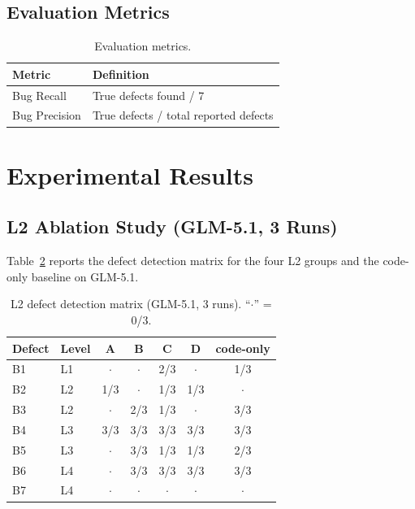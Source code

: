 \documentclass[sigconf,nonacm]{acmart}
\begin{document}
\subsection{Evaluation Metrics}

\begin{table}[t]
\caption{Evaluation metrics.}
\label{tab:metrics}
\small
\begin{tabular}{ll}
\toprule
Metric & Definition \\
\midrule
Bug Recall & True defects found / 7 \\
Bug Precision & True defects / total reported defects \\
\bottomrule
\end{tabular}
\end{table}

\section{Experimental Results}

\subsection{L2 Ablation Study (GLM-5.1, 3 Runs)}

Table~\ref{tab:glm-matrix} reports the defect detection matrix for the four L2 groups and the code-only baseline on GLM-5.1.

\begin{table}[t]
\caption{L2 defect detection matrix (GLM-5.1, 3 runs). ``$\cdot$'' = 0/3.}
\label{tab:glm-matrix}
\small
\begin{tabular}{llccccc}
\toprule
Defect & Level & A & B & C & D & code-only \\
\midrule
B1 & L1 & $\cdot$ & $\cdot$ & 2/3 & $\cdot$ & 1/3 \\
B2 & L2 & 1/3 & $\cdot$ & 1/3 & 1/3 & $\cdot$ \\
B3 & L2 & $\cdot$ & 2/3 & 1/3 & $\cdot$ & 3/3 \\
B4 & L3 & 3/3 & 3/3 & 3/3 & 3/3 & 3/3 \\
B5 & L3 & $\cdot$ & 3/3 & 1/3 & 1/3 & 2/3 \\
B6 & L4 & $\cdot$ & 3/3 & 3/3 & 3/3 & 3/3 \\
B7 & L4 & $\cdot$ & $\cdot$ & $\cdot$ & $\cdot$ & $\cdot$ \\
\bottomrule
\end{tabular}
\end{table}
\end{document}
